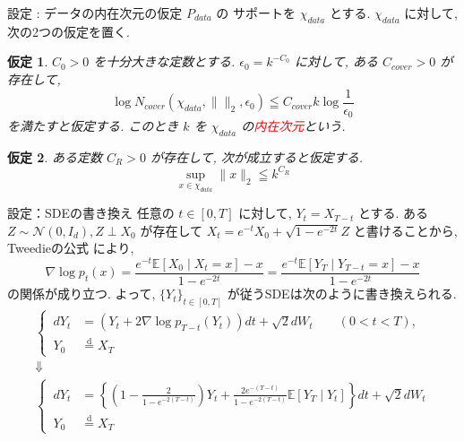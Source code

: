 \documentclass[11pt]{beamer}
\newtheorem{assumption}{仮定}
\newcommand{\E}{\mathbb{E}}
\newcommand{\StdNormal}{\mathcal{N}(0,I_d)}
\begin{document}
\begin{frame}{設定 : データの内在次元の仮定}
      $P_{data}$ の サポートを $\chi_{data}$ とする.
      $\chi_{data}$ に対して, 次の2つの仮定を置く.
      \begin{assumption}
        $C_0 > 0$ を十分大きな定数とする. $\epsilon_0=k^{-C_0}$ に対して, ある $C_{cover}>0$ が存在して,
        \begin{equation*}
          \log{N_{cover}(\chi_{data},\|\|_2,\epsilon_0)}\leqq C_{cover}k\log{\frac{1}{\epsilon_0}}
        \end{equation*}
        を満たすと仮定する. このとき $k$ を $\chi_{data}$ の\textcolor{red}{内在次元}という.
      \end{assumption}
      \begin{assumption}
        ある定数 $C_R>0$ が存在して, 次が成立すると仮定する.
        \begin{equation*}
          \sup\limits_{x\in \chi_{data}}\|x\|_2\leqq k^{C_R}
        \end{equation*}
      \end{assumption}
\end{frame}

\begin{frame}[t]{設定：SDEの書き換え}
  任意の $t\in[0,T]$ に対して, $Y_t=X_{T-t}$ とする.
  ある $Z\sim \StdNormal, Z\perp X_0$ が存在して $X_t=e^{-t}X_0+\sqrt{1-e^{-2t}}Z$ と書けることから, Tweedieの公式 \citep{efron2011} により,
  \begin{equation*}
    \nabla\log{p_t(x)}
    =\frac{e^{-t}\E[X_0\mid X_t=x]-x}{1-e^{-2t}}
    =\frac{e^{-t}\E[Y_T\mid Y_{T-t}=x]-x}{1-e^{-2t}}
  \end{equation*}
  の関係が成り立つ.
  よって, $\{Y_t\}_{t\in[0,T]}$ が従うSDEは次のように書き換えられる.
  \begingroup
    \small
    \begin{gather*}
      \left\{ \,
        \begin{aligned}
          dY_t &= (Y_t+2\nabla \log{p_{T-t}(Y_t)})dt+\sqrt{2}dW_t
            \qquad (0<t<T), \\
          Y_0 &\stackrel{\mathrm{d}}{=} X_T
        \end{aligned}
      \right.
      \\[-0.4em]
      \Downarrow
      \\[-0.4em]
      \left\{ \,
        \begin{aligned}
          dY_t &={} \left\{\left(1-\frac{2}{1-e^{-2(T-t)}}\right)Y_t
            +\frac{2e^{-(T-t)}}{1-e^{-2(T-t)}}\E[Y_T\mid Y_t]\right\}dt+\sqrt{2}dW_t \\
          Y_0 &\stackrel{\mathrm{d}}{=} X_T
        \end{aligned}
      \right.
    \end{gather*}
  \endgroup
\end{frame}
\end{document}
